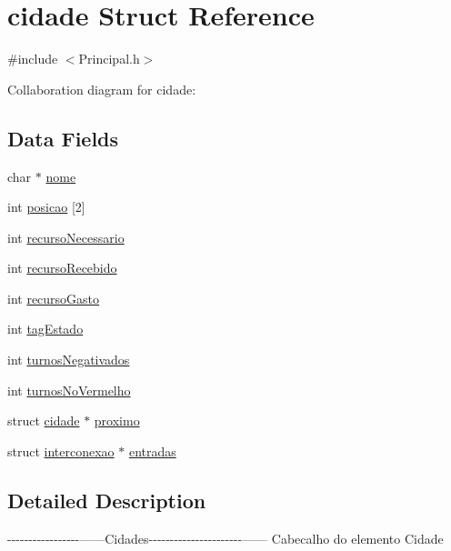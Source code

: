 \hypertarget{structcidade}{\section{cidade Struct Reference}
\label{structcidade}
}


{\ttfamily \#include $<$Principal.\-h$>$}



Collaboration diagram for cidade\-:
\subsection*{Data Fields}
\begin{DoxyCompactItemize}
\item 
char $\ast$ \hyperlink{structcidade_ae2a0f66178bb1c4d42e2b70ec9426ccb}{nome}
\item 
int \hyperlink{structcidade_a7e30d633898517077a4363ad6fade5b6}{posicao} \mbox{[}2\mbox{]}
\item 
int \hyperlink{structcidade_ae8b356353114803f6f5076a6b7bb411a}{recurso\-Necessario}
\item 
int \hyperlink{structcidade_a34541bd6c7eec1f2049716b02efe9572}{recurso\-Recebido}
\item 
int \hyperlink{structcidade_a4c30c9bf20d81925543c43abfaee74ac}{recurso\-Gasto}
\item 
int \hyperlink{structcidade_a8d061419bb8ae9b9fa16677008e41883}{tag\-Estado}
\item 
int \hyperlink{structcidade_a04ccadacb6fd2e1b9ce7469caee09cdd}{turnos\-Negativados}
\item 
int \hyperlink{structcidade_a15629cd2f5e328c1abbb6ee4b09b0af1}{turnos\-No\-Vermelho}
\item 
struct \hyperlink{structcidade}{cidade} $\ast$ \hyperlink{structcidade_ac7a8c5f5dbf854099849bd3d9ab51517}{proximo}
\item 
struct \hyperlink{structinterconexao}{interconexao} $\ast$ \hyperlink{structcidade_ae28777a0a252764c89fe126c8d7fba4a}{entradas}
\end{DoxyCompactItemize}


\subsection{Detailed Description}
-\/-\/-\/-\/-\/-\/-\/-\/-\/-\/-\/-\/-\/-\/-\/-\/-\/------Cidades-\/-\/-\/-\/-\/-\/-\/-\/-\/-\/-\/-\/-\/-\/-\/-\/-\/-\/-\/-\/-\/-\/------ Cabecalho do elemento Cidade

